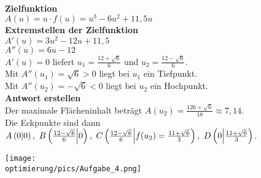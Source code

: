 \begin{Answer}[ref=optimierungA4]\\
	\begin{minipage}{\textwidth}
		\begin{minipage}{.5\textwidth}\raggedright
			\textbf{Zielfunktion}\\
			\(A(u)=u\cdot f(u)=u^3-6u^2+11,5u\)\\
			\textbf{Extremstellen der Zielfunktion}\\
			\(A'(u)=3u^2-12u+11,5\)\\
			\(A''(u)=6u-12\)\\
			\(A'(u)=0\) liefert \(u_1=\frac{12+\sqrt{6}}{6}\) und \(u_2=\frac{12-\sqrt{6}}{6}\).\\
			Mit \(A''(u_1)=\sqrt{6}>0\) liegt bei \(u_1\) ein Tiefpunkt.\\
			Mit \(A''(u_2)=-\sqrt{6}<0\) liegt bei \(u_2\) ein Hochpunkt.\\
			\textbf{Antwort erstellen}\\
			Der maximale Flächeninhalt beträgt \(A\left(u_2\right)=\frac{126+\sqrt{6}}{18}\approx 7,14\).\\
			Die Eckpunkte sind dann 
			\(A\left(0\vert 0\right),
			\ B\left(\frac{12-\sqrt{6}}{6}\middle\vert 0\right),\newline
			\ C\left(\frac{12-\sqrt{6}}{6}\middle\vert f(u_2)=\frac{11+\sqrt{6}}{3}\right),\ D\left(0\middle\vert \frac{11+\sqrt{6}}{3}\right)\).
		\end{minipage}
		\begin{minipage}{.5\textwidth}
			\texttt{[image: \\optimierung/pics/Aufgabe\_4.png]}
		\end{minipage}
	\end{minipage}
\end{Answer}
